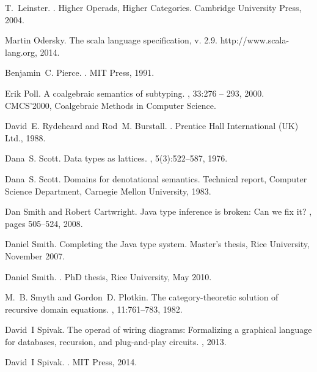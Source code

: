 \documentclass[twocolumn,english]{article}
\numberwithin{equation}{section}
\numberwithin{figure}{section}
\begin{document}
\begin{thebibliography}{10}
	T.~Leinster.
	.
	\newblock Higher Operads, Higher Categories. Cambridge University Press, 2004.
	
	Martin Odersky.
	\newblock The scala language specification, v. 2.9.
	\newblock http://www.scala-lang.org, 2014.
	
	Benjamin~C. Pierce.
	.
	\newblock MIT Press, 1991.
	
	Erik Poll.
	\newblock A coalgebraic semantics of subtyping.
	, 33:276 --
	293, 2000.
	\newblock CMCS'2000, Coalgebraic Methods in Computer Science.
	
	David~E. Rydeheard and Rod~M. Burstall.
	.
	\newblock Prentice Hall International (UK) Ltd., 1988.
	
	Dana~S. Scott.
	\newblock Data types as lattices.
	, 5(3):522--587, 1976.
	
	Dana~S. Scott.
	\newblock Domains for denotational semantics.
	\newblock Technical report, Computer Science Department, Carnegie Mellon
	University, 1983.
	
	Dan Smith and Robert Cartwright.
	\newblock Java type inference is broken: Can we fix it?
	, pages 505--524, 2008.
	
	Daniel Smith.
	\newblock Completing the {J}ava type system.
	\newblock Master's thesis, Rice University, November 2007.
	
	Daniel Smith.
	.
	\newblock PhD thesis, Rice University, May 2010.
	
	M.~B. Smyth and Gordon~D. Plotkin.
	\newblock The category-theoretic solution of recursive domain equations.
	, 11:761--783, 1982.
	
	David~I Spivak.
	\newblock The operad of wiring diagrams: Formalizing a graphical language for
	databases, recursion, and plug-and-play circuits.
	, 2013.
	
	David~I Spivak.
	.
	\newblock MIT Press, 2014.
	

\end{thebibliography}
\end{document}
